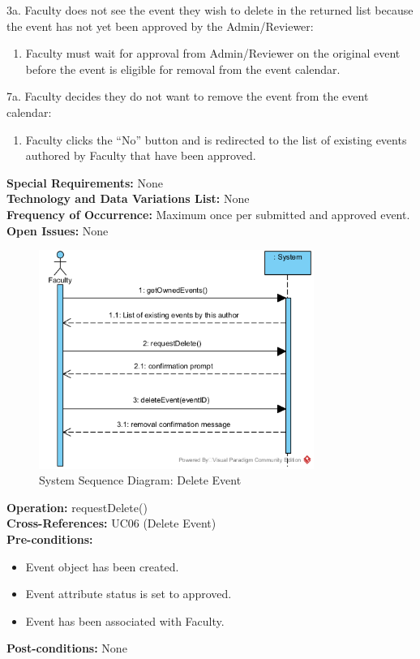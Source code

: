 \documentclass{article}
\begin{document}
3a. Faculty does not see the event they wish to delete in the returned list because the event has not yet been approved by the Admin/Reviewer:
\begin{enumerate}
    \item Faculty must wait for approval from Admin/Reviewer on the original event before the event is eligible for removal from the event calendar.
\end{enumerate}
7a. Faculty decides they do not want to remove the event from the event calendar:
\begin{enumerate}
    \item Faculty clicks the ``No'' button and is redirected to the list of existing events authored by Faculty that have been approved.
\end{enumerate}
\textbf{Special Requirements:} None \\
\textbf{Technology and Data Variations List:} None \\
\textbf{Frequency of Occurrence:} Maximum once per submitted and approved event. \\
\textbf{Open Issues:} None \\

\begin{figure}[H]
    \centering
    \includegraphics[width=0.8\textwidth]{images/SSD-UC06-DeleteEvent.png}
    \centering
    \caption{System Sequence Diagram: Delete Event}
\end{figure}

\textbf{Operation:} requestDelete() \\
\textbf{Cross-References:} UC06 (Delete Event) \\
\textbf{Pre-conditions:}
\begin{itemize}
    \item Event object has been created.
    \item Event attribute status is set to approved.
    \item Event has been associated with Faculty.
\end{itemize}
\textbf{Post-conditions:} None \\
\end{document}

